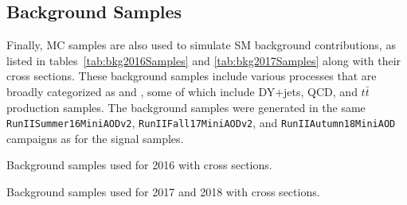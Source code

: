 \subsection{Background Samples}

Finally, MC samples are also used to simulate SM background contributions, as listed in tables~\ref{tab:bkg2016Samples} and \ref{tab:bkg2017Samples} along with their cross sections.
These background samples include various processes that are broadly categorized as \Wjets and \WVt, some of which include DY+jets, QCD, and $t\bar{t}$ production samples.
The background samples were generated in the same \texttt{RunIISummer16MiniAODv2}, \texttt{RunIIFall17MiniAODv2}, and \texttt{RunIIAutumn18MiniAOD} campaigns as for the signal samples.

\begin{table}[htbp]
  \centering
  
  \caption{
    Background samples used for 2016 with cross sections.
  }
  \label{tab:bkg2016Samples}
\end{table}

\begin{table}[htbp]
  \centering
  
  \caption{
    Background samples used for 2017 and 2018 with cross sections.
  }
  \label{tab:bkg2017Samples}
\end{table}
